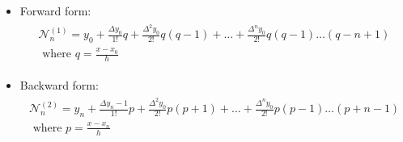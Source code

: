      \begin{itemize}
        \item Forward form:
          \begin{align*}
            \begin{aligned}
              \mathcal{N}_n^{(1)} = y_0 + \frac{\Delta y_0}{1!}q
                                  + \frac{\Delta^2 y_0}{2!}q(q - 1)
                                  + \ldots
                                  + \frac{\Delta^n y_0}{2!}q(q - 1)\ldots(q - n + 1) \\
              \mbox{ where } q = \frac{x - x_0}{h}
            \end{aligned}
          \end{align*}
        \item Backward form:
          \begin{align*}
            \begin{aligned}
              \mathcal{N}_n^{(2)} = y_n + \frac{\Delta y_n - 1}{1!}p
                                  + \frac{\Delta^2 y_0}{2!}p(p + 1)
                                  + \ldots
                                  + \frac{\Delta^n y_0}{2!}p(p - 1)\ldots(p + n - 1) \\
              \mbox{ where } p = \frac{x - x_n}{h}
            \end{aligned}
          \end{align*}
      \end{itemize}


